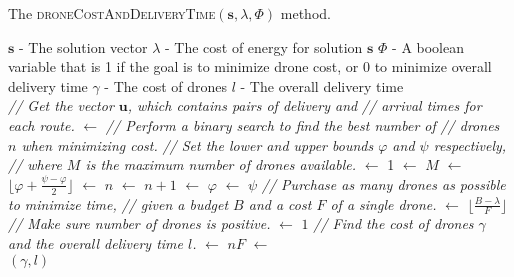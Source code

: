 \documentclass[journal]{IEEEtran}
\begin{document}
\begin{algorithm}[t!]
\caption{The \textsc{droneCostAndDeliveryTime}$({\ensuremath{\mathbf{s}}},{\ensuremath{\lambda}},{\ensuremath{\Phi}})$ method.}
\label{alg:drone-cost}
\begin{algorithmic}
\Require
\Statex ${\ensuremath{\mathbf{s}}}$ - The solution vector
\Statex ${\ensuremath{\lambda}}$ - The cost of energy for solution ${\ensuremath{\mathbf{s}}}$
\Statex ${\ensuremath{\Phi}}$ - A boolean variable that is 1 if the goal is to minimize drone cost, or 0 to minimize overall delivery time
\Ensure
\Statex ${\ensuremath{\gamma}}$ - The cost of drones
\Statex ${\ensuremath{l}}$ - The overall delivery time
\\
\State \emph{// Get the vector ${\ensuremath{\mathbf{u}}}$, which contains pairs of delivery and}
\State \emph{// arrival times for each route.}
{ $\gets$ {}}
\State \emph{// Perform a binary search to find the best number of}
\State \emph{// drones ${\ensuremath{n}}$ when minimizing cost.}
\If{${\ensuremath{\Phi}}$}
\State \emph{// Set the lower and upper bounds ${\ensuremath{\varphi}}$ and ${\ensuremath{\psi}}$ respectively,}
\State \emph{// where ${\ensuremath{M}}$ is the maximum number of drones available.}
{\State {${\ensuremath{\varphi}}$} $\gets$ {1}}
{\State {${\ensuremath{\psi}}$} $\gets$ {${\ensuremath{M}}$}}
{ $\gets$ {$\lfloor {\ensuremath{\varphi}} + \frac{{\ensuremath{\psi}}-{\ensuremath{\varphi}}}{2} \rfloor$}}
{\State {${\ensuremath{\psi}}$} $\gets$ {${\ensuremath{n}}$}}
\Else
{\State {${\ensuremath{\varphi}}$} $\gets$ {${\ensuremath{n}}+1$}}
\EndIf
\EndWhile
{ $\gets$ {${\ensuremath{\varphi}}$}}
{ $\gets$ {${\ensuremath{\psi}}$}}
\EndIf
\Else
\State \emph{// Purchase as many drones as possible to minimize time,}
\State \emph{// given a budget ${\ensuremath{B}}$ and a cost ${\ensuremath{F}}$ of a single drone.}
{ $\gets$ {$\lfloor \frac{{\ensuremath{B}} - {\ensuremath{\lambda}}}{\ensuremath{F}} \rfloor$}}
\State \emph{// Make sure number of drones is positive.}
{ $\gets$ {$1$}}
\EndIf
\EndIf
\State \emph{// Find the cost of drones ${\ensuremath{\gamma}}$ and the overall delivery time ${\ensuremath{l}}$.}
{\State {${\ensuremath{\gamma}}$} $\gets$ {${\ensuremath{n}} {\ensuremath{F}}$}}
{ $\gets$ {}}
\\
\Return $({\ensuremath{\gamma}},{\ensuremath{l}})$
\end{algorithmic}
\end{algorithm}
\end{document}
